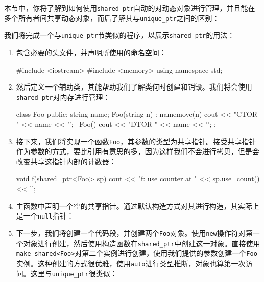本节中，你将了解到如何使用\texttt{shared\_ptr}自动的对动态对象进行管理，并且能在多个所有者间共享动态对象，而后了解其与\texttt{unique\_ptr}之间的区别：


我们将完成一个与\texttt{unique\_ptr}节类似的程序，以展示\texttt{shared\_ptr}的用法：

\begin{enumerate}
\item 包含必要的头文件，并声明所使用的命名空间：

\begin{codebox}[cpp]
#include <iostream>
#include <memory>
using namespace std; 
\end{codebox}

\item 然后定义一个辅助类，其能帮助我们了解类何时创建和销毁。我们将会使用\texttt{shared\_ptr}对内存进行管理：

\begin{codebox}[cpp]
class Foo
{
public:
    string name;
    Foo(string n)
        : name{move(n)}
    { cout << "CTOR " << name << '\n'; }
    ~Foo() { cout << "DTOR " << name << '\n'; }
};
\end{codebox}

\item 接下来，我们将实现一个函数\texttt{Foo}，其参数的类型为共享指针。接受共享指针作为参数的方式，要比引用有意思的多，因为这样我们不会进行拷贝，但是会改变共享这指针内部的计数器：

\begin{codebox}[cpp]
void f(shared_ptr<Foo> sp)
{
    cout << "f: use counter at "
        << sp.use_count() << '\n';
}
\end{codebox}

\item 主函数中声明一个空的共享指针。通过默认构造方式对其进行构造，其实际上是一个\texttt{null}指针：

\begin{codebox}[cpp]
int main()
{
    shared_ptr<Foo> fa;
\end{codebox}

\item 下一步，我们将创建一个代码段，并创建两个\texttt{Foo}对象。使用\texttt{new}操作符对第一个对象进行创建，然后使用构造函数在\texttt{shared\_ptr}中创建这一对象。直接使用\texttt{make\_shared<Foo>}对第二个实例进行创建，使用我们提供的参数创建一个\texttt{Foo}实例。这种创建的方式很优雅，使用\texttt{auto}进行类型推断，对象也算第一次访问。这里与\texttt{unique\_ptr}很类似：


\end{enumerate}

